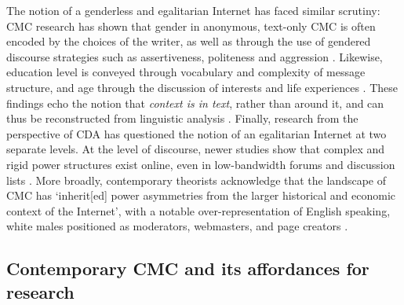 
The notion of a genderless and egalitarian Internet has faced similar scrutiny: \gls{CMC} research has shown that gender in anonymous, text\hyp{}only \gls{CMC} is often encoded by the  choices of the writer, as well as through the use of gendered discourse strategies such as assertiveness, politeness and aggression \cite{herring_gender_2000}. Likewise, education level is conveyed through vocabulary and complexity of message structure, and age through the discussion of interests and life experiences \cite{herring_computer-mediated_2001}. These findings echo the  notion that \emph{context is in text}, rather than around it, and can thus be reconstructed from linguistic analysis \cite[see Section \ref{sect:sfl}, as well as][]{eggins_introduction_2004}. Finally, research from the perspective of \gls{CDA} has questioned the notion of an egalitarian Internet at two separate levels. At the level of discourse, newer studies show that complex and rigid power structures exist online, even in low\hyp{}bandwidth \glspl{forum} and discussion lists \cite[e.g.][]{stommel_online_2010}. More broadly, contemporary theorists acknowledge that the landscape of \gls{CMC} has `inherit[ed] power asymmetries from the larger historical and economic context of the Internet', with a notable over-representation of English speaking, white males positioned as moderators, webmasters, and page creators \cite[p.~12]{herring_computer-mediated_2001}.


\subsection{Contemporary CMC and its affordances for research}

